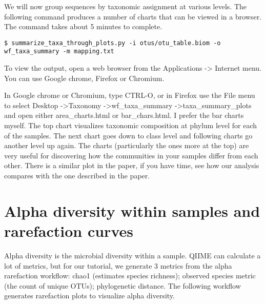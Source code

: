 \documentclass[a4paper,12pt,twoside]{memoir}
\begin{document}
\begin{steps}
We will now group sequences by taxonomic assignment at various levels. The following command produces a number of charts that can be viewed in a browser. The command takes about 5 minutes to complete.
\begin{lstlisting}
$ summarize_taxa_through_plots.py -i otus/otu_table.biom -o wf_taxa_summary -m mapping.txt
\end{lstlisting}

 To view the output, open a web browser from the Applications -> Internet menu. You can use Google chrome, Firefox or Chromium.

 In Google chrome or Chromium, type CTRL-O, or in Firefox use the File menu to select Desktop -\textgreater Taxonomy -\textgreater wf\_taxa\_summary -\textgreater taxa\_summary\_plots and open either area\_charts.html or bar\_chars.html. I prefer the bar charts myself. The top chart visualizes taxonomic composition at phylum level for each of the samples. The next chart goes down to class level and following charts go another level up again. The charts (particularly the ones more at the top) are very useful for discovering how the communities in your samples differ from each other. There is a similar plot in the paper, if you have time, see how our analysis compares with the one described in the paper.
\end{steps}

\section{Alpha diversity within samples and rarefaction curves}

\begin{information}
 Alpha diversity is the microbial diversity within a sample. QIIME can calculate a lot of metrics, but for our tutorial, we generate 3 metrics from the alpha rarefaction workflow: chao1 (estimates species richness); observed species metric (the count of unique OTUs); phylogenetic distance. The following workflow generates rarefaction plots to visualize alpha diversity.
\end{information}
\end{document}
